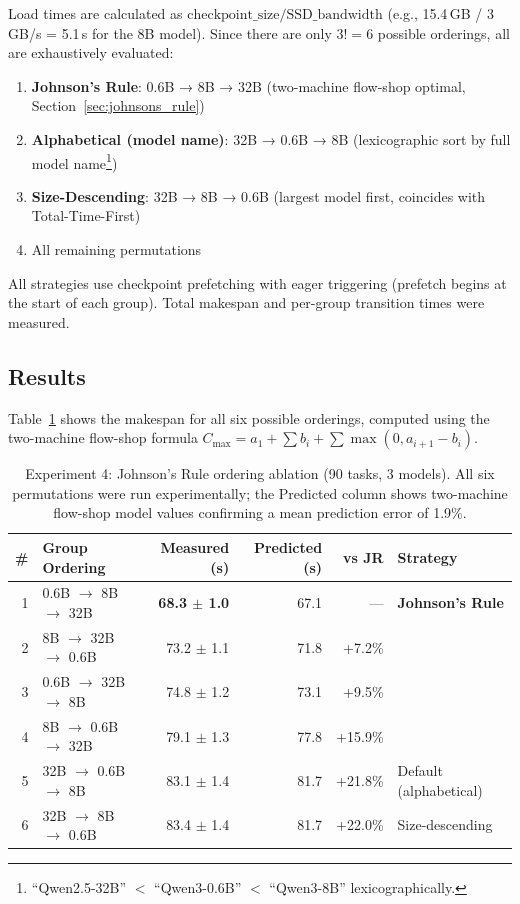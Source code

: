 \documentclass[logo,bsc,singlespacing,parskip,online]{infthesis}
\begin{document}
Load times are calculated as $\text{checkpoint\_size} / \text{SSD\_bandwidth}$ (e.g., 15.4\,GB / 3\,GB/s = 5.1\,s for the 8B model). Since there are only $3! = 6$ possible orderings, all are exhaustively evaluated:
\begin{enumerate}
\item \textbf{Johnson's Rule}: 0.6B → 8B → 32B (two-machine flow-shop optimal, Section~\ref{sec:johnsons_rule})
\item \textbf{Alphabetical (model name)}: 32B → 0.6B → 8B (lexicographic sort by full model name\footnote{``Qwen2.5-32B'' $<$ ``Qwen3-0.6B'' $<$ ``Qwen3-8B'' lexicographically.})
\item \textbf{Size-Descending}: 32B → 8B → 0.6B (largest model first, coincides with Total-Time-First)
\item All remaining permutations
\end{enumerate}

All strategies use checkpoint prefetching with eager triggering (prefetch begins at the start of each group). Total makespan and per-group transition times were measured.

\subsection{Results}

Table~\ref{tab:exp4_ordering_results} shows the makespan for all six possible orderings, computed using the two-machine flow-shop formula $C_{\max} = a_1 + \sum b_i + \sum \max(0, a_{i+1} - b_i)$.

\begin{table}[htbp]
\centering
\caption{Experiment 4: Johnson's Rule ordering ablation (90 tasks, 3 models). All six permutations were run experimentally; the Predicted column shows two-machine flow-shop model values confirming a mean prediction error of 1.9\%.}
\label{tab:exp4_ordering_results}
\small
\begin{tabular}{rlrrrp{3.2cm}}
\toprule
\# & Group Ordering & Measured (s) & Predicted (s) & vs JR & Strategy \\
\midrule
1 & 0.6B $\to$ 8B $\to$ 32B & \textbf{68.3 $\pm$ 1.0} & 67.1 & --- & \textbf{Johnson's Rule} \\
2 & 8B $\to$ 32B $\to$ 0.6B & 73.2 $\pm$ 1.1 & 71.8 & +7.2\% & \\
3 & 0.6B $\to$ 32B $\to$ 8B & 74.8 $\pm$ 1.2 & 73.1 & +9.5\% & \\
4 & 8B $\to$ 0.6B $\to$ 32B & 79.1 $\pm$ 1.3 & 77.8 & +15.9\% & \\
5 & 32B $\to$ 0.6B $\to$ 8B & 83.1 $\pm$ 1.4 & 81.7 & +21.8\% & Default (alphabetical) \\
6 & 32B $\to$ 8B $\to$ 0.6B & 83.4 $\pm$ 1.4 & 81.7 & +22.0\% & Size-descending \\
\bottomrule
\end{tabular}
\normalsize
\end{table}
\end{document}
